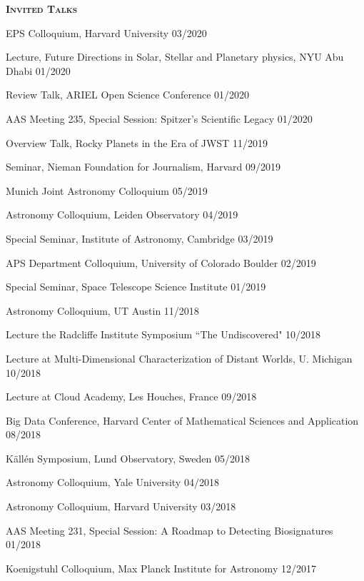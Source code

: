 \documentclass[12pt,letterpaper]{article}
\begin{document}
\vspace{3mm}



\vspace{5mm}
\textbf{\textsc{Invited Talks}} 
\begin{compactitem}[]
\item {EPS Colloquium, Harvard University \hfill 03/2020}
\item {Lecture, Future Directions in Solar, Stellar and Planetary physics, NYU Abu Dhabi \hfill 01/2020}
\item {Review Talk, ARIEL Open Science Conference \hfill 01/2020} 
\item {AAS Meeting 235, Special Session: Spitzer's Scientific Legacy \hfill 01/2020}
\item {Overview Talk, Rocky Planets in the Era of JWST \hfill 11/2019}
\item {Seminar, Nieman Foundation for Journalism, Harvard \hfill 09/2019}
\item {Munich Joint Astronomy Colloquium \hfill 05/2019}
\item {Astronomy Colloquium, Leiden Observatory \hfill 04/2019}
\item {Special Seminar, Institute of Astronomy, Cambridge \hfill 03/2019}
\item {APS Department Colloquium, University of Colorado Boulder \hfill 02/2019}
\item {Special Seminar, Space Telescope Science Institute \hfill 01/2019}
\item {Astronomy Colloquium, UT Austin \hfill 11/2018}
\item {Lecture the Radcliffe Institute Symposium ``The Undiscovered" \hfill 10/2018}
\item {Lecture at Multi-Dimensional Characterization of Distant Worlds, U. Michigan \hfill 10/2018}
\item {Lecture at Cloud Academy, Les Houches, France \hfill 09/2018} 
\item {Big Data Conference, Harvard Center of Mathematical Sciences and Application \hfill 08/2018}
\item {K\"{a}ll\'{e}n Symposium, Lund Observatory, Sweden \hfill 05/2018}
\item {Astronomy Colloquium, Yale University \hfill 04/2018}
\item{Astronomy Colloquium, Harvard University \hfill 03/2018}
\item {AAS Meeting 231, Special Session: A Roadmap to Detecting Biosignatures \hfill 01/2018}
\item {Koenigstuhl Colloquium, Max Planck Institute for Astronomy \hfill 12/2017}

\end{compactitem}
\end{document}
